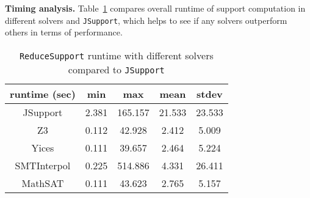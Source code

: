 \textbf{Timing analysis.} Table~\ref{tab:eff-comp-jsup} compares overall runtime of support computation in different solvers and \texttt{JSupport}, which helps to see if any solvers outperform others in terms of performance.
\begin{table}
  \centering
  \begin{tabular}{ |c||c|c|c|c| }
    \hline
     runtime (sec) & min & max & mean & stdev \\[0.5ex]
    \hline\hline
    JSupport & 2.381 & 165.157 & 21.533 & 23.533 \\[0.5ex]
    Z3   & 0.112 & 42.928 & 2.412 & 5.009 \\[0.5ex]
    Yices &   0.111  & 39.657   & 2.464 & 5.224 \\[0.5ex]
    SMTInterpol& 0.225 & 514.886 &  4.331 & 26.411 \\[0.5ex]
    MathSAT & 0.111 & 43.623 &  2.765 & 5.157 \\[0.5ex]
    \hline
  \end{tabular}
  \caption{\small{\texttt{ReduceSupport} runtime with different solvers compared to \texttt{JSupport}}}
  \label{tab:eff-comp-jsup}
\end{table}




